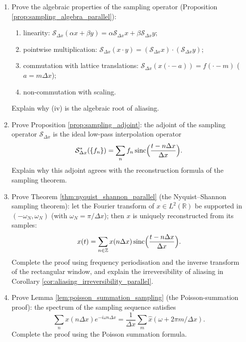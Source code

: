 \begin{enumerate}[leftmargin=3em, label=\textbf{Exercise \arabic*}]
    \item Prove the algebraic properties of the sampling operator (Proposition \ref{prop:sampling_algebra_parallel}):
    \begin{enumerate}[label=(\roman*)]
        \item linearity: $\mathcal{S}_{\Delta x}(\alpha x+\beta y)
              =\alpha\mathcal{S}_{\Delta x}x+\beta\mathcal{S}_{\Delta x}y$;
        \item pointwise multiplication: $\mathcal{S}_{\Delta x}(x\cdot y)
              =(\mathcal{S}_{\Delta x}x)\cdot(\mathcal{S}_{\Delta x}y)$;
        \item commutation with lattice translations: $\mathcal{S}_{\Delta x}(x(\cdot-a))=f(\cdot-m)$ ($a=m\Delta x$);
        \item non-commutation with scaling.
    \end{enumerate}
    Explain why (iv) is the algebraic root of aliasing.

    \item Prove Proposition \ref{prop:sampling_adjoint}:
    the adjoint of the sampling operator $\mathcal{S}_{\Delta x}$ is the ideal low-pass interpolation operator
    \[
    \mathcal{S}_{\Delta x}^*(\{f_n\})
    =\sum_n f_n\operatorname{sinc}
    \Bigl(\frac{t-n\Delta x}{\Delta x}\Bigr).
    \]
    Explain why this adjoint agrees with the reconstruction formula of the sampling theorem.

    \item Prove Theorem \ref{thm:nyquist_shannon_parallel} (the Nyquist--Shannon sampling theorem):
    let the Fourier transform of $x\in L^2(\mathbb{R})$ be supported in
    $(-\omega_N,\omega_N)$ (with $\omega_N=\pi/\Delta x$);
    then $x$ is uniquely reconstructed from its samples:
    \[
    x(t)=\sum_{n\in\mathbb{Z}}x(n\Delta x)\operatorname{sinc}
    \Bigl(\frac{t-n\Delta x}{\Delta x}\Bigr).
    \]
    Complete the proof using frequency periodisation and the inverse transform of the rectangular window,
    and explain the irreversibility of aliasing in Corollary \ref{cor:aliasing_irreversibility_parallel}.

    \item Prove Lemma \ref{lem:poisson_summation_sampling} (the Poisson-summation proof):
    the spectrum of the sampling sequence satisfies
    \[
    \sum_{n}x(n\Delta x)e^{-i\omega n\Delta x}
    =\frac{1}{\Delta x}\sum_m\hat x(\omega+2\pi m/\Delta x).
    \]
    Complete the proof using the Poisson summation formula.


\end{enumerate}
